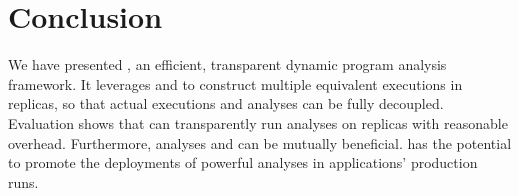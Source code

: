 \section{Conclusion} \label{sec:conclusion}

We have presented \xxx, an efficient, transparent dynamic program analysis 
framework. It leverages \smr and \dmt to construct multiple equivalent 
executions in replicas, so that actual executions and analyses can be fully 
decoupled. Evaluation shows that \xxx can transparently run analyses on 
replicas with reasonable overhead. Furthermore, analyses and \xxx can be 
mutually beneficial. \xxx has the potential to promote the deployments of 
powerful analyses in applications' production runs.